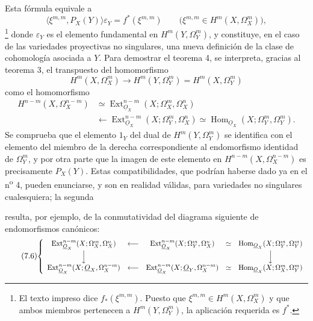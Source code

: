 \documentclass[11pt,twoside,openany]{book}
\numberwithin{equation}{section}
\newcommand{\src}[1]{%
  \phantomsection\hypertarget{src:#1}{}%
  \marginpar{\raggedleft\footnotesize\sffamily #1}%
}
\newcommand{\Osh}{\underline{O}}
\theoremstyle{plain}
\theoremstyle{definition}
\theoremstyle{remark}
\newcommand{\FgaUnitKey}{frontmatter}
\renewcommand{\src}[1]{%
  \phantomsection\hypertarget{src:\FgaUnitKey:#1}{}%
  \marginpar{\raggedleft\footnotesize\sffamily #1}%
}
\theoremstyle{plain}
\theoremstyle{definition}
\theoremstyle{remark}
\begin{document}
Esta fórmula equivale a
\begin{equation}\tag{7.4 bis}
  \bigl\langle\xi^{m,m},P_X(Y)\bigr\rangle\varepsilon_Y
  =f^{*}(\xi^{m,m})
  \qquad
  \bigl(\xi^{m,m}\in H^{m}(X,\Omega_X^{m})\bigr),
\end{equation}
\footnote{El texto impreso dice $f_{*}(\xi^{m,m})$. Puesto que
$\xi^{m,m}\in H^{m}(X,\Omega_X^{m})$ y que ambos miembros pertenecen a
$H^{m}(Y,\Omega_Y^{m})$, la aplicación requerida es $f^{*}$.} donde
$\varepsilon_Y$ es el elemento fundamental en $H^{m}(Y,\Omega_Y^{m})$, y
constituye, en el caso de las variedades proyectivas no singulares, una nueva
definición de la clase de cohomología asociada a $Y$. Para demostrar el
teorema 4, se interpreta, gracias al teorema 3, el transpuesto del homomorfismo
\[
  H^{m}(X,\Omega_X^{m})
  \longrightarrow H^{m}(Y,\Omega_Y^{m})
  =H^{m}(X,\Omega_Y^{m})
\]
como el homomorfismo
\begin{equation}\tag{7.5}
\begin{split}
  H^{n-m}(X,\Omega_X^{n-m})
  &\simeq
  \operatorname{Ext}_{\Osh_X}^{n-m}(X;\Omega_X^{m},\Omega_X^{n})\\
  &\longleftarrow
  \operatorname{Ext}_{\Osh_X}^{n-m}(X;\Omega_Y^{m},\Omega_X^{n})
  \simeq
  \operatorname{Hom}_{\Osh_X}(X;\Omega_Y^{m},\Omega_Y^{m}).
\end{split}
\end{equation}
Se comprueba que el elemento $1_Y$ del dual de $H^{m}(Y,\Omega_Y^{m})$ se identifica
con el elemento del miembro de la derecha correspondiente al endomorfismo identidad de
$\Omega_Y^{m}$, y por otra parte que la imagen de este elemento en
$H^{n-m}(X,\Omega_X^{n-m})$ es precisamente $P_X(Y)$. Estas compatibilidades, que podrían
haberse dado ya en el n\textsuperscript{o} 4, pueden enunciarse, y son
en realidad válidas, para variedades no singulares cualesquiera; la segunda

\src{189}
resulta, por ejemplo, de la conmutatividad del diagrama siguiente de endomorfismos
canónicos:
\begin{equation}\tag{7.6}
\resizebox{\textwidth}{!}{$
\left\{
\begin{array}{ccccc}
\operatorname{Ext}_{\Osh_X}^{n-m}(X;\Omega_X^{m},\Omega_X^{n})
&\longleftarrow&
\operatorname{Ext}_{\Osh_X}^{n-m}(X;\Omega_Y^{m},\Omega_X^{n})
&\simeq&
\operatorname{Hom}_{\Osh_X}(X;\Omega_Y^{m},\Omega_Y^{m})\\[3pt]
\Big\downarrow&&&&\Big\downarrow\\[3pt]
\operatorname{Ext}_{\Osh_X}^{n-m}(X;\Osh_X,\Omega_X^{n-m})
&\longleftarrow&
\operatorname{Ext}_{\Osh_X}^{n-m}(X;\Osh_Y,\Omega_X^{n-m})
&\simeq&
\operatorname{Hom}_{\Osh_X}(X;\Omega_X^{m},\Omega_Y^{m})
\end{array}
\right.
$}
\end{equation}
\end{document}

